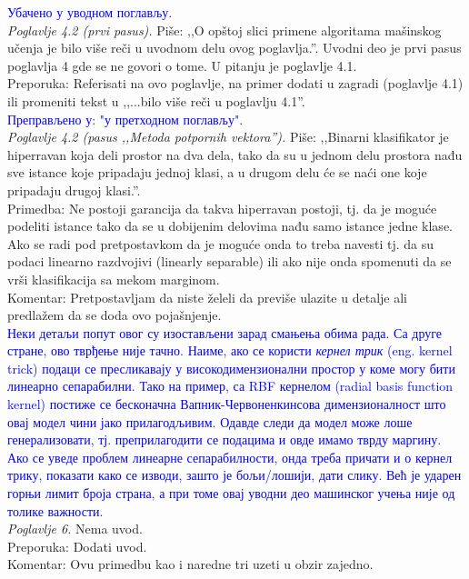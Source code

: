 \documentclass[a4paper]{report}
\newcommand{\odgovor}[1]{\textcolor{blue}{#1}}
\begin{document}
\odgovor{Убачено у уводном поглављу.}\\


\textit{Poglavlje 4.2 (prvi pasus).} Piše: ,,O opštoj slici primene algoritama mašinskog učenja je bilo više reči u uvodnom delu ovog poglavlja.''. Uvodni deo je prvi pasus poglavlja 4 gde se ne govori o tome. U pitanju je poglavlje 4.1. \\
\indent Preporuka: Referisati na ovo poglavlje, na primer dodati u zagradi (poglavlje 4.1) ili promeniti tekst u ,,...bilo više reči u poglavlju 4.1''. \\


\odgovor{Преправљено у: "у претходном поглављу".}\\


\textit{Poglavlje 4.2 (pasus ,,Metoda potpornih vektora'').} Piše: ,,Binarni klasifikator je hiperravan koja deli prostor na dva dela, tako da su u jednom delu prostora nađu sve istance koje pripadaju jednoj klasi, a u drugom delu će se naći one koje pripadaju drugoj klasi.''. \\
\indent Primedba: Ne postoji garancija da takva hiperravan postoji, tj. da je moguće podeliti istance tako da se u dobijenim delovima nađu samo istance jedne klase. Ako se radi pod pretpostavkom da je moguće onda to treba navesti tj. da su podaci linearno razdvojivi (linearly separable) ili ako nije onda spomenuti da se vrši klasifikacija sa mekom marginom. \\
\indent Komentar: Pretpostavljam da niste želeli da previše ulazite u detalje ali predlažem da se doda ovo pojašnjenje. \\


\odgovor{Неки детаљи попут овог су изостављени зарад смањења обима рада. Са друге стране, ово тврђење није тачно. Наиме, ако се користи \textit{кернел трик} (eng. kernel trick) подаци се пресликавају у високодимензионални простор у коме могу бити линеарно сепарабилни. Тако на пример, са RBF кернелом (radial basis function kernel) постиже се бесконачна Вапник-Червоненкинсова димензионалност што овај модел чини јако прилагодљивим. Одавде следи да модел може лоше генерализовати, тј. преприлагодити се подацима и овде имамо тврду маргину. Ако се уведе проблем линеарне сепарабилности, онда треба причати и о кернел трику, показати како се изводи, зашто је бољи/лошији, дати слику. Већ је ударен горњи лимит броја страна, а при томе овај уводни део машинског учења није од толике важности.}\\


\textit{Poglavlje 6.} Nema uvod. \\
\indent Preporuka: Dodati uvod. \\
\indent Komentar: Ovu primedbu kao i naredne tri uzeti u obzir zajedno. \\
\end{document}
